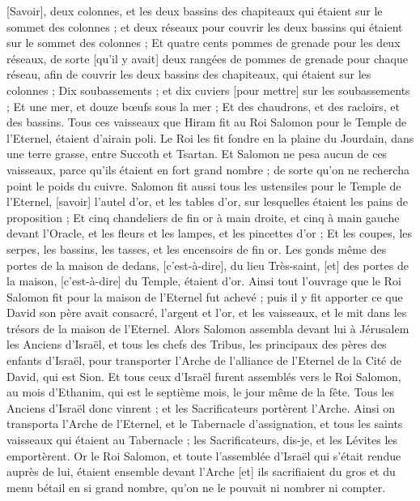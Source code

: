 \begin{multicols}{2}
[Savoir], deux colonnes, et les deux bassins des chapiteaux qui étaient sur le sommet des colonnes ; et deux réseaux pour couvrir les deux bassins qui étaient sur le sommet des colonnes ;
Et quatre cents pommes de grenade pour les deux réseaux, de sorte [qu'il y avait] deux rangées de pommes de grenade pour chaque réseau, afin de couvrir les deux bassins des chapiteaux, qui étaient sur les colonnes ;
Dix soubassements ; et dix cuviers [pour mettre] sur les soubassements ;
Et une mer, et douze bœufs sous la mer ;
Et des chaudrons, et des racloirs, et des bassins. Tous ces vaisseaux que Hiram fit au Roi Salomon pour le Temple de l'Eternel, étaient d'airain poli.
Le Roi les fit fondre en la plaine du Jourdain, dans une terre grasse, entre Succoth et Tsartan.
Et Salomon ne pesa aucun de ces vaisseaux, parce qu'ils étaient en fort grand nombre ; de sorte qu'on ne rechercha point le poids du cuivre.
Salomon fit aussi tous les ustensiles pour le Temple de l'Eternel, [savoir] l'autel d'or, et les tables d'or, sur lesquelles étaient les pains de proposition ;
Et cinq chandeliers de fin or à main droite, et cinq à main gauche devant l'Oracle, et les fleurs et les lampes, et les pincettes d'or ;
Et les coupes, les serpes, les bassins, les tasses, et les encensoirs de fin or. Les gonds même des portes de la maison de dedans, [c'est-à-dire], du lieu Très-saint, [et] des portes de la maison, [c'est-à-dire] du Temple, étaient d'or.
Ainsi tout l'ouvrage que le Roi Salomon fit pour la maison de l'Eternel fut achevé ; puis il y fit apporter ce que David son père avait consacré, l'argent et l'or, et les vaisseaux, et le mit dans les trésors de la maison de l'Eternel.
\VerseOne{}Alors Salomon assembla devant lui à Jérusalem les Anciens d'Israël, et tous les chefs des Tribus, les principaux des pères des enfants d'Israël, pour transporter l'Arche de l'alliance de l'Eternel de la Cité de David, qui est Sion.
Et tous ceux d'Israël furent assemblés vers le Roi Salomon, au mois d'Ethanim, qui est le septième mois, le jour même de la fête.
Tous les Anciens d'Israël donc vinrent ; et les Sacrificateurs portèrent l'Arche.
Ainsi on transporta l'Arche de l'Eternel, et le Tabernacle d'assignation, et tous les saints vaisseaux qui étaient au Tabernacle ; les Sacrificateurs, dis-je, et les Lévites les emportèrent.
Or le Roi Salomon, et toute l'assemblée d'Israël qui s'était rendue auprès de lui, étaient ensemble devant l'Arche [et] ils sacrifiaient du gros et du menu bétail en si grand nombre, qu'on ne le pouvait ni nombrer ni compter.

\end{multicols}
